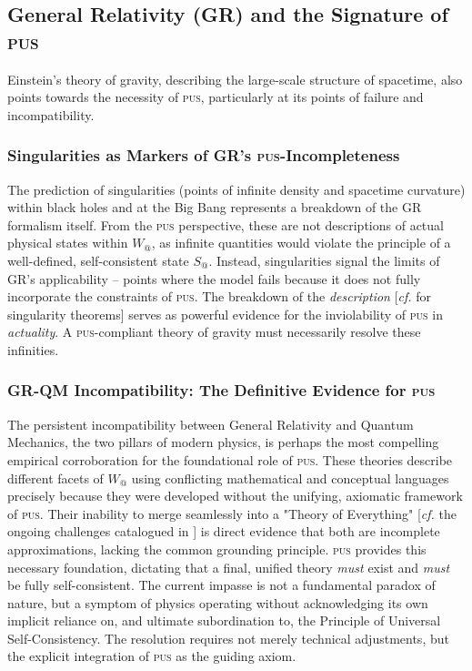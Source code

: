 \documentclass[11pt, a4paper]{article}
\makeatletter
\newcommand{\pus}{\textsc{pus}} %
\newcommand{\Wactual}{W_{@}} %
\newcommand{\Sactual}{S_{@}} %
\makeatother
\begin{document}
\subsection{General Relativity (GR) and the Signature of \pus}
Einstein's theory of gravity, describing the large-scale structure of spacetime, also points towards the necessity of \pus, particularly at its points of failure and incompatibility.

\subsubsection{Singularities as Markers of GR's \pus-Incompleteness}
The prediction of singularities (points of infinite density and spacetime curvature) within black holes and at the Big Bang represents a breakdown of the GR formalism itself. From the \pus{} perspective, these are not descriptions of actual physical states within $\Wactual$, as infinite quantities would violate the principle of a well-defined, self-consistent state $\Sactual$. Instead, singularities signal the limits of GR's applicability – points where the model fails because it does not fully incorporate the constraints of \pus. The breakdown of the \textit{description} [\textit{cf.} \citealp{hawking1973} for singularity theorems] serves as powerful evidence for the inviolability of \pus{} in \textit{actuality}. A \pus-compliant theory of gravity must necessarily resolve these infinities.

\subsubsection{GR-QM Incompatibility: The Definitive Evidence for \pus}
The persistent incompatibility between General Relativity and Quantum Mechanics, the two pillars of modern physics, is perhaps the most compelling empirical corroboration for the foundational role of \pus. These theories describe different facets of $\Wactual$ using conflicting mathematical and conceptual languages precisely because they were developed without the unifying, axiomatic framework of \pus. Their inability to merge seamlessly into a "Theory of Everything" [\textit{cf.} the ongoing challenges catalogued in \citealp{rovelli2004}] is direct evidence that both are incomplete approximations, lacking the common grounding principle. \pus{} provides this necessary foundation, dictating that a final, unified theory \textit{must} exist and \textit{must} be fully self-consistent. The current impasse is not a fundamental paradox of nature, but a symptom of physics operating without acknowledging its own implicit reliance on, and ultimate subordination to, the Principle of Universal Self-Consistency. The resolution requires not merely technical adjustments, but the explicit integration of \pus{} as the guiding axiom.
\end{document}
